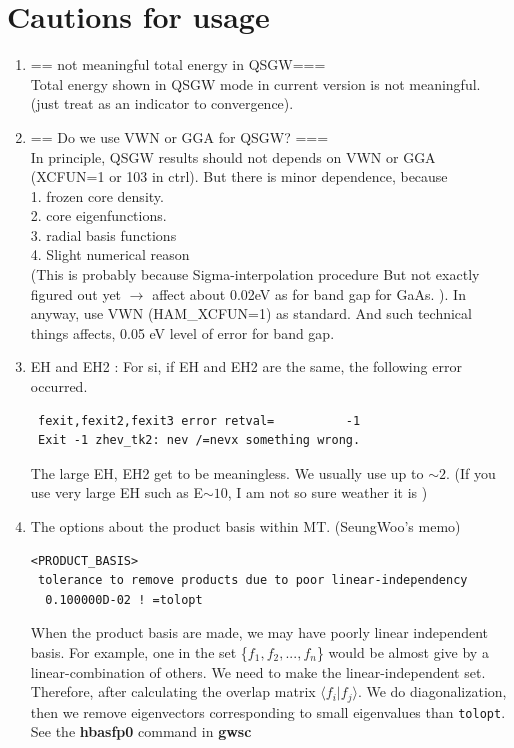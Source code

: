 \documentclass[a4paper,10pt,epsf,fleqn]{article}
\begin{document}
{\section{Cautions for usage}
\label{cautionusage}
\begin{enumerate}
 \item == not meaningful total energy in QSGW===\\
 Total energy shown in QSGW mode in current version is not meaningful. 
(just treat as an indicator to convergence).

\item == Do we use VWN or GGA for QSGW? ===\\
  In principle, QSGW results should not depends on VWN or GGA 
  (XCFUN=1 or 103 in ctrl). But there is minor dependence, because\\
   1. frozen core density.\\
   2. core eigenfunctions.\\
   3. radial basis functions\\
   4. Slight numerical reason \\
      (This is probably because Sigma-interpolation procedure
       But not exactly figured out yet
       $\rightarrow$ affect about 0.02eV as for band gap for GaAs. ).
  In anyway, use VWN (HAM\_XCFUN=1) as standard.
  And such technical things affects, 0.05 eV level of error for band gap.

\item{EH and EH2} : For si, if EH and EH2 are the same, the following
     error occurred. 
\begin{verbatim}
 fexit,fexit2,fexit3 error retval=          -1
 Exit -1 zhev_tk2: nev /=nevx something wrong.
\end{verbatim}
     The large EH, EH2 get to be meaningless. We usually use up to 
     $\sim 2$. (If you use very large EH such as E$\sim 10$, I am not so
     sure weather it is )

\item { The options about the product basis within MT. (SeungWoo's memo)}

\begin{verbatim}
<PRODUCT_BASIS>
 tolerance to remove products due to poor linear-independency
  0.100000D-02 ! =tolopt
\end{verbatim}
When the product basis are made, we may have poorly linear independent
basis. For example, one in the set \{$f_1, f_2, ..., f_n$\} would 
be almost give by a linear-combination of others. We need to make the
      linear-independent set. Therefore, after calculating the overlap matrix 
      $\langle  f_i|f_j \rangle$. We do diagonalization, then 
      we remove eigenvectors corresponding to small eigenvalues than
      \verb+tolopt+. 
      See the {\bf hbasfp0} command in {\bf gwsc}


\end{enumerate}}
\end{document}
